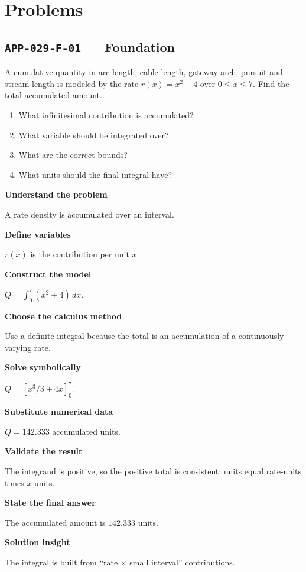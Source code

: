 \documentclass[11pt]{book}
\newcommand{\pid}[1]{\texttt{#1}}
\begin{document}
\section*{Problems}
\subsection*{\pid{APP-029-F-01} — Foundation}
\begin{problembox}
A cumulative quantity in arc length, cable length, gateway arch, pursuit and stream length is modeled by the rate $r(x)=x^2+4$ over $0\le x\le 7$. Find the total accumulated amount.
\end{problembox}
\begin{promptbox}\begin{enumerate}
\item What infinitesimal contribution is accumulated?
\item What variable should be integrated over?
\item What are the correct bounds?
\item What units should the final integral have?
\end{enumerate}\end{promptbox}
\begin{solutionbox}
\textbf{Understand the problem}\par A rate density is accumulated over an interval.\par\medskip
\textbf{Define variables}\par $r(x)$ is the contribution per unit $x$.\par\medskip
\textbf{Construct the model}\par $Q=\int_0^{7}(x^2+4)\,dx$.\par\medskip
\textbf{Choose the calculus method}\par Use a definite integral because the total is an accumulation of a continuously varying rate.\par\medskip
\textbf{Solve symbolically}\par $Q=[x^3/3+4x]_0^{7}$.\par\medskip
\textbf{Substitute numerical data}\par $Q=142.333$ accumulated units.\par\medskip
\textbf{Validate the result}\par The integrand is positive, so the positive total is consistent; units equal rate-units times $x$-units.\par\medskip
\textbf{State the final answer}\par The accumulated amount is $142.333$ units.\par\medskip
\textbf{Solution insight}\par The integral is built from “rate × small interval” contributions.\par\medskip
\end{solutionbox}
\end{document}
